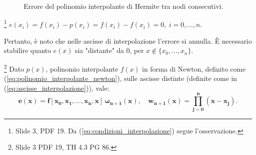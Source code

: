 \begin{figure}[ht]
 	\caption{Errore del polinomio interpolante di Hermite tra nodi consecutivi.}
 	\label{fig:errore_polinomio_hermite}
 \end{figure}
 
\begin{remark}
    \footnote{Slide 3, PDF 19. Da (\ref{eq:condizioni_interpolazione}) segue l'osservazione.} $e(x_i)=f(x_i)-p(x_i)=f(x_i)-f(x_i)=0,\; i=0,\hdots,n.$
\end{remark}

Pertanto, è noto che nelle ascisse di interpolazione l'errore si annulla. È necessario stabilire quanto $e(x)$ sia "distante" da 0, per $x\notin \{x_0,\hdots, x_n\}.$

\begin{theorem}\label{th:errore_interpolazione_forma_newton}\footnote{Slide 3 PDF 19, TH 4.3 PG 86.} 
	Dato $p(x)$, polinomio interpolante $f(x)$ in forma di Newton, definito come (\ref{eq:polinomio_interpolante_newton}), sulle ascisse distinte (definite come in (\ref{eq:ascisse_interpolazione})), vale:
    \begin{equation}\label{eq:errore_interpolazione_forma_newton}
        \boldsymbol{e(x)=f[x_0,x_1,\hdots,x_n,x]\,\omega_{n+1}(x),\quad w_{n+1}(x)=\prod_{j=0}^{n}(x-x_j)}.
    \end{equation}
\end{theorem}

